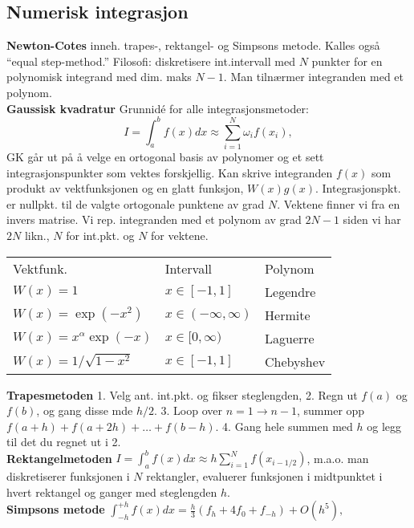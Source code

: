 \documentclass[12pt,a4paper,twocolumn]{article}
\begin{document}
\begin{flushleft}
\subsection{Numerisk integrasjon} %
\label{sub:numerisk_integrasjon}
\textbf{Newton-Cotes} inneh. trapes-, rektangel- og Simpsons metode. Kalles også ``equal step-method.'' Filosofi: diskretisere int.intervall med $N$ punkter for en polynomisk integrand med dim. maks $N-1$. Man tilnærmer integranden med et polynom.\\ 
\textbf{Gaussisk kvadratur} %
Grunnidé for alle integrasjonsmetoder:
\begin{equation*} 
   I=\int_a^bf(x)dx \approx \sum_{i=1}^N\omega_if(x_i),  
\end{equation*}
GK går ut på å velge en ortogonal basis av polynomer og et sett integrasjonspunkter som vektes forskjellig. Kan skrive integranden $f(x)$ som produkt av vektfunksjonen og en glatt funksjon, $W(x)g(x)$. Integrasjonspkt. er nullpkt. til de valgte ortogonale punktene av grad $N$. Vektene finner vi fra en invers matrise. Vi rep. integranden med et polynom av grad $2N-1$ siden vi har $2N$ likn., $N$ for int.pkt. og $N$ for vektene.\\
\begin{table}[H]
  \centering
  \begin{tabular}{ l l l }
    Vektfunk. & Intervall & Polynom \\
    $W(x)=1$&$x\in[-1,1]$&Legendre\\
    $W(x)=\exp(-x^2)$&$x\in(-\infty,\infty)$&Hermite\\
    $W(x)=x^\alpha\exp(-x)$&$x\in[0,\infty)$&Laguerre\\
    $W(x)=1/\sqrt{1-x^2}$&$x\in[-1,1]$&Chebyshev\\
  \end{tabular}
\end{table}
\textbf{Trapesmetoden} 1. Velg ant. int.pkt. og fikser steglengden, 2. Regn ut $f(a)$ og $f(b)$, og gang disse mde $h/2$. 3. Loop over $n=1\to n-1$, summer opp $f(a+h)+f(a+2h)+\ldots+f(b-h)$. 4. Gang hele summen med $h$ og legg til det du regnet ut i 2.\\
\textbf{Rektangelmetoden} $I=\int_a^bf(x) dx \approx  h\sum_{i=1}^N f(x_{i-1/2})$, m.a.o. man diskretiserer funksjonen i $N$ rektangler, evaluerer funksjonen i midtpunktet i hvert rektangel og ganger med steglengden $h$.\\
\textbf{Simpsons metode} $\int_{-h}^{+h}f(x)dx=\frac{h}{3}\left(f_h + 4f_0 + f_{-h}\right)+O(h^5),$\\

\end{flushleft}
\end{document}
